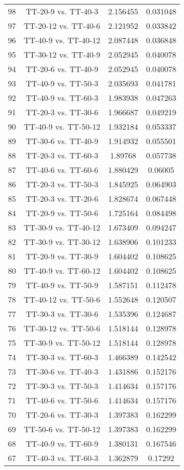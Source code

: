 \documentclass[a4paper,10pt]{article}
\begin{document}
\begin{landscape}
\begin{table}[!htp]
\begin{tabular}{cccc}
98&TT-20-9 vs. TT-40-3&2.156455&0.031048\\
97&TT-20-12 vs. TT-40-6&2.121952&0.033842\\
96&TT-40-9 vs. TT-40-12&2.087448&0.036848\\
95&TT-30-12 vs. TT-40-9&2.052945&0.040078\\
94&TT-20-6 vs. TT-40-9&2.052945&0.040078\\
93&TT-40-9 vs. TT-50-3&2.035693&0.041781\\
92&TT-40-9 vs. TT-60-3&1.983938&0.047263\\
91&TT-20-3 vs. TT-30-6&1.966687&0.049219\\
90&TT-40-9 vs. TT-50-12&1.932184&0.053337\\
89&TT-30-6 vs. TT-40-9&1.914932&0.055501\\
88&TT-20-3 vs. TT-60-3&1.89768&0.057738\\
87&TT-40-6 vs. TT-60-6&1.880429&0.06005\\
86&TT-20-3 vs. TT-50-3&1.845925&0.064903\\
85&TT-20-3 vs. TT-20-6&1.828674&0.067448\\
84&TT-20-9 vs. TT-50-6&1.725164&0.084498\\
83&TT-30-9 vs. TT-40-12&1.673409&0.094247\\
82&TT-30-9 vs. TT-30-12&1.638906&0.101233\\
81&TT-20-9 vs. TT-30-9&1.604402&0.108625\\
80&TT-40-9 vs. TT-60-12&1.604402&0.108625\\
79&TT-40-9 vs. TT-50-9&1.587151&0.112478\\
78&TT-40-12 vs. TT-50-6&1.552648&0.120507\\
77&TT-30-3 vs. TT-30-6&1.535396&0.124687\\
76&TT-30-12 vs. TT-50-6&1.518144&0.128978\\
75&TT-30-9 vs. TT-50-12&1.518144&0.128978\\
74&TT-30-3 vs. TT-60-3&1.466389&0.142542\\
73&TT-30-6 vs. TT-40-3&1.431886&0.152176\\
72&TT-30-3 vs. TT-50-3&1.414634&0.157176\\
71&TT-40-6 vs. TT-50-6&1.414634&0.157176\\
70&TT-20-6 vs. TT-30-3&1.397383&0.162299\\
69&TT-50-6 vs. TT-50-12&1.397383&0.162299\\
68&TT-40-9 vs. TT-60-9&1.380131&0.167546\\
67&TT-40-3 vs. TT-60-3&1.362879&0.17292\\

\end{tabular}
\end{table}
\end{landscape}
\end{document}
